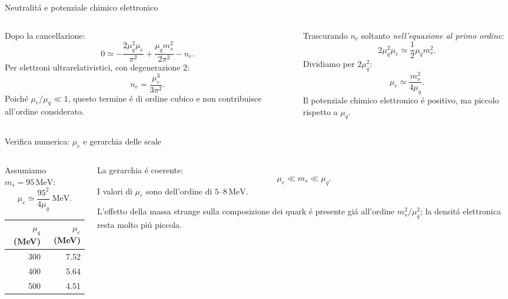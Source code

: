 \begin{frame}[t]{Neutralit\'a e potenziale chimico elettronico}
\small
\begin{columns}[T,onlytextwidth]
\begin{column}{0.49\textwidth}
Dopo la cancellazione:
\[
0\simeq
-\frac{2\mu_q^2\mu_e}{\pi^2}
+\frac{\mu_qm_s^2}{2\pi^2}
-n_e.
\]
Per elettroni ultrarelativistici, con degenerazione 2:
\[
n_e=\frac{\mu_e^3}{3\pi^2}.
\]
Poich\'e $\mu_e/\mu_q\ll1$, questo termine \'e di ordine cubico e non contribuisce all'ordine considerato.
\end{column}
\begin{column}{0.49\textwidth}
Trascurando $n_e$ soltanto \emph{nell'equazione al primo ordine}:
\[
2\mu_q^2\mu_e\simeq\frac12\mu_qm_s^2.
\]
Dividiamo per $2\mu_q^2$:
\[
\boxed{\mu_e\simeq\frac{m_s^2}{4\mu_q}}.
\]
Il potenziale chimico elettronico \'e positivo, ma piccolo rispetto a $\mu_q$.
\end{column}
\end{columns}
\end{frame}

\begin{frame}[t]{Verifica numerica: $\mu_e$ e gerarchia delle scale}
\small
\begin{columns}[T,onlytextwidth]
\begin{column}{0.49\textwidth}
Assumiamo $m_s=95\,\mathrm{MeV}$:
\[
\mu_e\simeq\frac{95^2}{4\mu_q}
\;\mathrm{MeV}.
\]
\centering
\begin{tabular}{r|r}
$\mu_q$ (MeV) & $\mu_e$ (MeV)\\ \hline
300 & 7.52\\
400 & 5.64\\
500 & 4.51
\end{tabular}
\end{column}
\begin{column}{0.49\textwidth}
La gerarchia \'e coerente:
\[
\mu_e\ll m_s\ll\mu_q.
\]
I valori di $\mu_e$ sono dell'ordine di $5$--$8\,\mathrm{MeV}$.

L'effetto della massa strange sulla composizione dei quark \'e presente gi\'a all'ordine $m_s^2/\mu_q^2$; la densit\'a elettronica resta molto pi\'u piccola.
\end{column}
\end{columns}
\end{frame}

